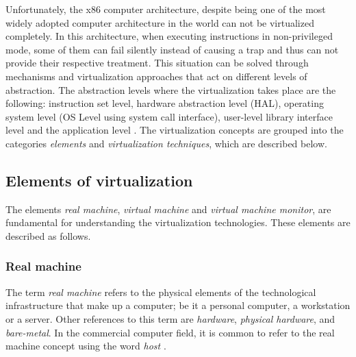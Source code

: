 	
	
	
	
	Unfortunately, the x86 computer architecture, despite being one of the most widely adopted computer architecture in the world can not be virtualized completely\cite{Adams}. In this architecture, when executing instructions in non-privileged mode, some of them can fail silently instead of causing a trap and thus can not provide their respective treatment. 
	This situation can be solved through mechanisms and  virtualization approaches that act on different levels of abstraction. The abstraction levels where the virtualization takes place are the following: instruction set level, hardware abstraction level (HAL), operating system level (OS Level using system call interface), user-level library interface level and the application level \cite{Chiueh2005}. The virtualization concepts are grouped into the categories \textit{elements} and \textit{virtualization techniques}, which are described below.
	
	\subsection{Elements of virtualization}
	
	The elements \textit {real machine}, \textit {virtual machine} and \textit {virtual machine monitor}, are fundamental for understanding the virtualization technologies.
	These elements are described as follows.
	
	\subsubsection{Real machine}
	
	The term \textit{real machine} refers to the physical elements of the technological infrastructure that make up a computer; be it a personal computer, a workstation or a server. 
	Other references to this term are \textit {hardware}, \textit {physical hardware}, and \textit{bare-metal}. 
	In the commercial computer field, it is common to refer to the real machine concept using the word \textit{host} \cite{VMware2008}.
	
